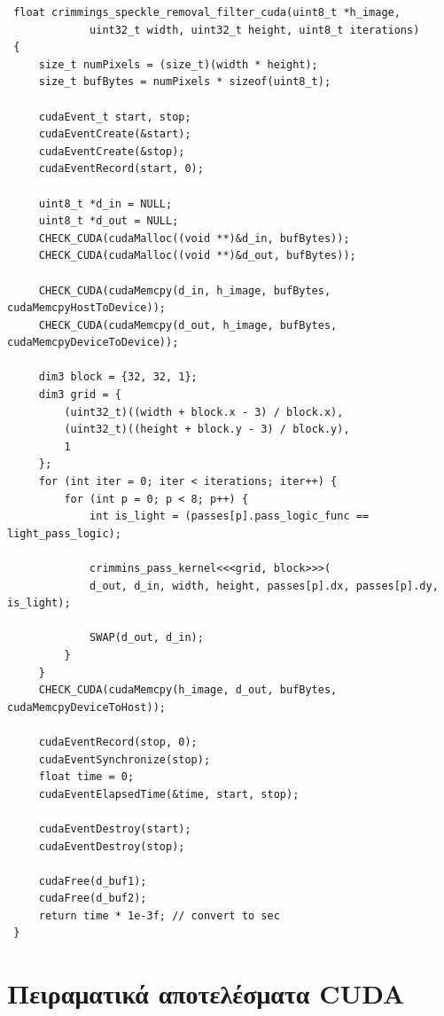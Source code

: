 \begin{verbatim}
 float crimmings_speckle_removal_filter_cuda(uint8_t *h_image,
             uint32_t width, uint32_t height, uint8_t iterations)
 {
     size_t numPixels = (size_t)(width * height);
     size_t bufBytes = numPixels * sizeof(uint8_t);

     cudaEvent_t start, stop;
     cudaEventCreate(&start);
     cudaEventCreate(&stop);
     cudaEventRecord(start, 0);

     uint8_t *d_in = NULL;
     uint8_t *d_out = NULL;
     CHECK_CUDA(cudaMalloc((void **)&d_in, bufBytes));
     CHECK_CUDA(cudaMalloc((void **)&d_out, bufBytes));

     CHECK_CUDA(cudaMemcpy(d_in, h_image, bufBytes, cudaMemcpyHostToDevice));
     CHECK_CUDA(cudaMemcpy(d_out, h_image, bufBytes, cudaMemcpyDeviceToDevice));

     dim3 block = {32, 32, 1};
     dim3 grid = {
         (uint32_t)((width + block.x - 3) / block.x),
         (uint32_t)((height + block.y - 3) / block.y),
         1
     };
     for (int iter = 0; iter < iterations; iter++) {
         for (int p = 0; p < 8; p++) {
             int is_light = (passes[p].pass_logic_func == light_pass_logic);

             crimmins_pass_kernel<<<grid, block>>>(
             d_out, d_in, width, height, passes[p].dx, passes[p].dy, is_light);

             SWAP(d_out, d_in);
         }
     }
     CHECK_CUDA(cudaMemcpy(h_image, d_out, bufBytes, cudaMemcpyDeviceToHost));

     cudaEventRecord(stop, 0);
     cudaEventSynchronize(stop);
     float time = 0;
     cudaEventElapsedTime(&time, start, stop);

     cudaEventDestroy(start);
     cudaEventDestroy(stop);

     cudaFree(d_buf1);
     cudaFree(d_buf2);
     return time * 1e-3f; // convert to sec
 }
\end{verbatim}

\section{Πειραματικά αποτελέσματα CUDA}

